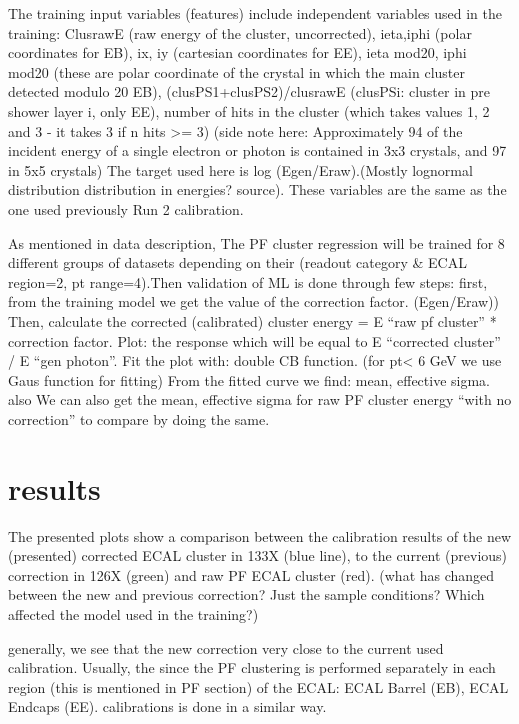 The training input variables (features) include independent variables used in the training:   
ClusrawE (raw energy of the cluster, uncorrected), 
ieta,iphi (polar coordinates for EB), 
ix, iy (cartesian coordinates for EE), 
ieta mod20, iphi mod20 (these are polar coordinate of the crystal in which the main cluster detected modulo 20 EB), 
(clusPS1+clusPS2)/clusrawE (clusPSi: cluster in pre shower layer i, only EE),   
number of hits in the cluster (which takes values 1, 2 and 3 - it takes 3 if n hits >= 3) (side note here: Approximately 94 of the incident energy of a single electron or photon is contained in 3x3 crystals, and 97 in 5x5 crystals) %
The target used here is log (Egen/Eraw).(Mostly lognormal distribution distribution in energies? source). These variables are the same as the one used previously Run 2 calibration. 

As mentioned in data description, The PF cluster regression will be trained for 8 different groups of datasets depending on their (readout category & ECAL region=2, pt range=4).Then validation of ML is done through few steps:  
first, from the training model we get the value of the correction factor. (Egen/Eraw)) 
Then, calculate the corrected (calibrated) cluster energy = E “raw pf cluster” * correction factor.  
Plot: the response which will be equal to E “corrected cluster” / E “gen photon”. 
Fit the plot with: double CB function. (for pt< 6 GeV we use Gaus function for fitting) 
From the fitted curve we find: mean, effective sigma. also We can also get the mean, effective sigma for raw PF cluster energy “with no correction” to compare by doing the same. 

\section{results}

The presented plots show a comparison between the calibration results of the new (presented) corrected ECAL cluster in 133X (blue line), to the current (previous) correction in 126X (green) and raw PF ECAL cluster (red). (what has changed between the new and previous correction? Just the sample conditions? Which affected the model used in the training?)  

generally, we see that the new correction very close to the current used calibration. Usually, the since the PF clustering is performed separately in each region (this is mentioned in PF section) of the ECAL: ECAL Barrel (EB), ECAL Endcaps (EE). calibrations is done in a similar way.

